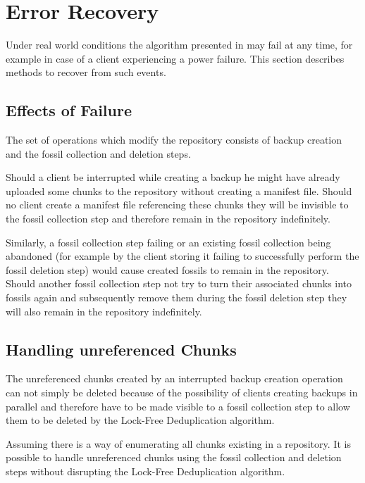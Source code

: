 \section{Error Recovery}\label{sec:errors}

Under real world conditions the algorithm presented in 
may fail at any time, for example in case of a client experiencing a power failure.
This section describes methods to recover from such events.

\subsection{Effects of Failure}

The set of operations which modify the repository consists of backup creation
and the fossil collection and deletion steps.

Should a client be interrupted while creating a backup he might have already
uploaded some chunks to the repository without creating a manifest file.
Should no client create a manifest file referencing these chunks they will be
invisible to the fossil collection step and therefore remain in the repository
indefinitely.

Similarly, a fossil collection step failing or an existing fossil collection being abandoned
(for example by the client storing it failing to successfully perform the fossil deletion step)
would cause created fossils to remain in the repository.
Should another fossil collection step not try to turn their associated chunks into
fossils again and subsequently remove them during the fossil deletion step they will also
remain in the repository indefinitely.

\subsection{Handling unreferenced Chunks}\label{sec:unreferenced-chunks}

The unreferenced chunks created by an interrupted backup creation operation can
not simply be deleted because of the possibility of clients creating backups in
parallel and therefore have to be made visible to a fossil collection step to
allow them to be deleted by the Lock-Free Deduplication algorithm.

\begin{thm}\label{thm:unreferenced-chunks}
    Assuming there is a way of enumerating all chunks existing in a repository.
    It is possible to handle unreferenced chunks using the fossil collection and
    deletion steps without disrupting the Lock-Free Deduplication algorithm.
\end{thm}

